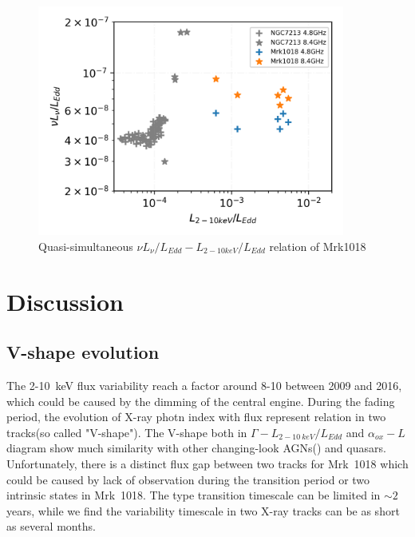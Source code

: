 \documentclass{aastex63}
\begin{document}
\begin{figure}
\centering
	\includegraphics[width=0.9\textwidth]{./pic/Mrk1018_ngc7213_radio_xray_rate.png}
    \caption{Quasi-simultaneous $\nu L_{\nu}/L_{Edd}-L_{2-10keV}/L_{Edd}$ relation of Mrk1018}
    \label{fig:radio-xray-rate_relation_plus_ngc7213}
\end{figure}




\section{Discussion}\label{sec:discussion}

\subsection{V-shape evolution}
The 2-10~keV flux variability reach a factor around 8-10 between 2009 and 2016, which could be caused by the dimming of the central engine. During the fading period, the evolution of X-ray photn index with flux represent relation in two tracks(so called "V-shape").  
The V-shape both in $\Gamma-L_{2-10~keV}/L_{Edd}$ and $\alpha_{ox}-L$ diagram show much similarity with other changing-look AGNs(\citep[see ][]{2019arXiv190904676R}) and quasars\citep[see ][]{2019ApJ...883...76R}.
Unfortunately, there is a distinct flux gap between two tracks for Mrk~1018 which could be caused by lack of observation during the transition period or two intrinsic states in Mrk~1018. The type transition timescale can be limited in $\sim 2$ years, while we find the variability timescale in two X-ray tracks can be as short as several months. 
 
\end{document}
